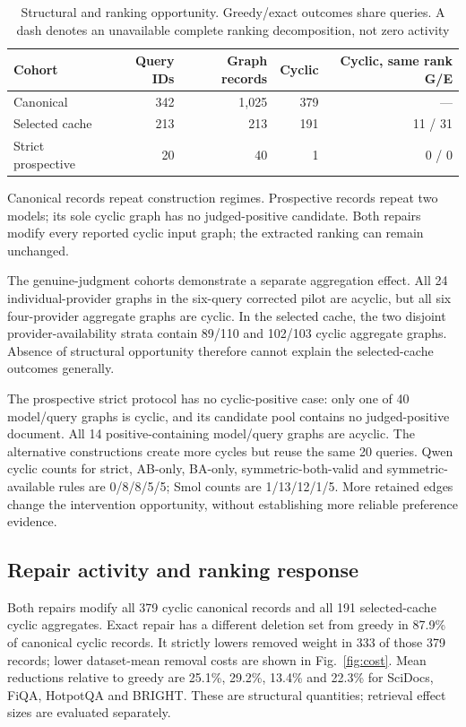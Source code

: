 \documentclass[pdflatex,iicol,sn-basic,Numbered]{sn-jnl}
\begin{document}
\begin{table}[t]
\caption{Structural and ranking opportunity. Greedy/exact outcomes share queries. A dash denotes an unavailable complete ranking decomposition, not zero activity}
\label{tab:opportunities}\papertable
\begin{tabularx}{\linewidth}{@{}Yrrrr@{}}\toprule
Cohort & Query IDs & Graph records & Cyclic & Cyclic, same rank G/E \\\midrule
Canonical &342&1,025&379&---\\\addlinespace
Selected cache &213&213&191&11 / 31\\\addlinespace
Strict prospective &20&40&1&0 / 0\\\bottomrule
\end{tabularx}
\smallskip\small
Canonical records repeat construction regimes. Prospective records repeat two models; its sole cyclic graph has no judged-positive candidate. Both repairs modify every reported cyclic input graph; the extracted ranking can remain unchanged.
\end{table}

The genuine-judgment cohorts demonstrate a separate aggregation effect. All 24 individual-provider graphs in the six-query corrected pilot are acyclic, but all six four-provider aggregate graphs are cyclic. In the selected cache, the two disjoint provider-availability strata contain 89/110 and 102/103 cyclic aggregate graphs. Absence of structural opportunity therefore cannot explain the selected-cache outcomes generally.

The prospective strict protocol has no cyclic-positive case: only one of 40 model/query graphs is cyclic, and its candidate pool contains no judged-positive document. All 14 positive-containing model/query graphs are acyclic. The alternative constructions create more cycles but reuse the same 20 queries. Qwen cyclic counts for strict, AB-only, BA-only, symmetric-both-valid and symmetric-available rules are 0/8/8/5/5; Smol counts are 1/13/12/1/5. More retained edges change the intervention opportunity, without establishing more reliable preference evidence.

\subsection{Repair activity and ranking response}
Both repairs modify all 379 cyclic canonical records and all 191 selected-cache cyclic aggregates. Exact repair has a different deletion set from greedy in 87.9\% of canonical cyclic records. It strictly lowers removed weight in 333 of those 379 records; lower dataset-mean removal costs are shown in Fig.~\ref{fig:cost}. Mean reductions relative to greedy are 25.1\%, 29.2\%, 13.4\% and 22.3\% for SciDocs, FiQA, HotpotQA and BRIGHT. These are structural quantities; retrieval effect sizes are evaluated separately.
\end{document}
